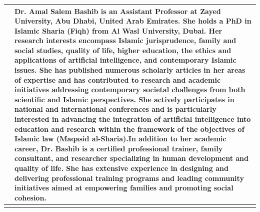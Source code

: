 \documentclass[11pt,a4paper]{article}
\begin{document}
	\begin{table}[h]
		\centering
		\begin{tabular}{|l|l|}
			\hline
			\textbf{
				
				\begin{figure}[h]
					\centering
					\fbox{\parbox{0.5\textwidth}{}}
				\end{figure}
				
			} & Dr. Amal Salem Bashib is an Assistant Professor at Zayed University, Abu Dhabi, United Arab Emirates. She holds a PhD in Islamic Sharia (Fiqh) from Al Wasl University, Dubai. Her research interests encompass Islamic jurisprudence, family and social studies, quality of life, higher education, the ethics and applications of artificial intelligence, and contemporary Islamic issues. She has published numerous scholarly articles in her areas of expertise and has contributed to research and academic initiatives addressing contemporary societal challenges from both scientific and Islamic perspectives. She actively participates in national and international conferences and is particularly interested in advancing the integration of artificial intelligence into education and research within the framework of the objectives of Islamic law (Maqasid al-Sharia).In addition to her academic career, Dr. Bashib is a certified professional trainer, family consultant, and researcher specializing in human development and quality of life. She has extensive experience in designing and delivering professional training programs and leading community initiatives aimed at empowering families and promoting social cohesion. \\ \hline
			\textbf{
				
				\begin{figure}[h]
					\centering
					\fbox{\parbox{0.5\textwidth}{}}
				\end{figure}
				
}
\end{tabular}
\end{table}
\end{document}

